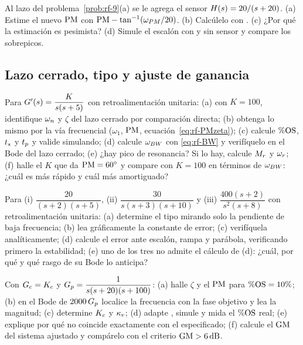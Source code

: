 \begin{problema}\label{prob:rf-10}
Al lazo del problema~\ref{prob:rf-9}(a) se le agrega el sensor $H(s)=20/(s+20)$. (a) Estime el nuevo $\mathrm{PM}$ con $\mathrm{PM}-\tan^{-1}(\omega_{PM}/20)$. (b) Calcúlelo con . (c) ¿Por qué la estimación es pesimista? (d) \etiquetaM{} Simule el escalón con y sin sensor y compare los sobrepicos.
\end{problema}

\subsection*{Lazo cerrado, tipo y ajuste de ganancia}

\begin{problema}[PM y transitorio]\label{prob:rf-11}
Para $G'(s)=\dfrac{K}{s(s+5)}$ con retroalimentación unitaria:
(a) con $K=100$, identifique $\omega_n$ y $\zeta$ del lazo cerrado por comparación directa;
(b) obtenga lo mismo por la vía frecuencial ($\omega_1$, $\mathrm{PM}$, ecuación~\eqref{eq:rf-PMzeta});
(c) calcule $\%\mathrm{OS}$, $t_s$ y $t_p$ y valide simulando;
(d) calcule $\omega_{BW}$ con \eqref{eq:rf-BW} y verifíquelo en el Bode del lazo cerrado;
(e) ¿hay pico de resonancia? Si lo hay, calcule $M_r$ y $\omega_r$;
(f) halle el $K$ que da $\mathrm{PM}=60^{\circ}$ y compare con $K=100$ en términos de $\omega_{BW}$: ¿cuál es más rápido y cuál más amortiguado?
\end{problema}

\begin{problema}\label{prob:rf-12}
Para (i) $\dfrac{20}{(s+2)(s+5)}$, (ii) $\dfrac{30}{s(s+3)(s+10)}$ y (iii) $\dfrac{400(s+2)}{s^2(s+8)}$ con retroalimentación unitaria:
(a) determine el tipo mirando solo la pendiente de baja frecuencia;
(b) lea gráficamente la constante de error;
(c) verifíquela analíticamente;
(d) calcule el error ante escalón, rampa y parábola, verificando primero la estabilidad;
(e) uno de los tres no admite el cálculo de (d): ¿cuál, por qué y qué rasgo de su Bode lo anticipa?
\end{problema}

\begin{problema}\label{prob:rf-13}
Con $G_c=K_c$ y $G_p=\dfrac{1}{s(s+20)(s+100)}$:
(a) halle $\zeta$ y el $\mathrm{PM}$ para $\%\mathrm{OS}=10\%$;
(b) en el Bode de $2000\,G_p$ localice la frecuencia con la fase objetivo y lea la magnitud;
(c) determine $K_c$ y $\kappa_v$;
(d) \etiquetaM{} adapte , simule y mida el $\%\mathrm{OS}$ real;
(e) explique por qué no coincide exactamente con el especificado;
(f) calcule el $\mathrm{GM}$ del sistema ajustado y compárelo con el criterio $\mathrm{GM}>6\,\mathrm{dB}$.
\end{problema}

